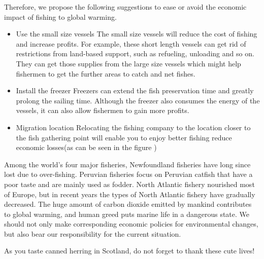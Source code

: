 \documentclass{mcmthesis}
\begin{document}
Therefore, we propose the following suggestions to ease or avoid the economic impact of fishing to global warming.

\begin{itemize}

\item 
Use the small size vessels
The small size vessels will reduce the cost of fishing and increase profits. For example, these short length vessels can get rid of restrictions from land-based support, such as refueling, unloading and so on. They can get those supplies from the large size vessels which might help fishermen to get the further areas to catch and net fishes.
\item
 Install the freezer
Freezers can extend the fish preservation time and greatly prolong the sailing time. Although the freezer also consumes the energy of the vessels, it can also allow fishermen to gain more profits.
\item 
Migration location
Relocating the fishing company to the location closer to the fish gathering point will  enable you to enjoy better fishing reduce economic losses(as can be seen in the figure ) 
\end{itemize}

Among the world's four major fisheries, Newfoundland fisheries have long since lost due to over-fishing. Peruvian fisheries focus on Peruvian catfish that have a poor taste and are mainly used as fodder. North Atlantic fishery nourished most of Europe, but in recent years the types of North Atlantic fishery have gradually decreased. 
The huge amount of carbon dioxide emitted by mankind contributes to global warming, and human greed puts marine life in a dangerous state. We should not only make corresponding economic policies for environmental changes, but also bear our responsibility for the current situation.

As you taste canned herring in Scotland, do not forget to thank these cute lives!









\end{document}
